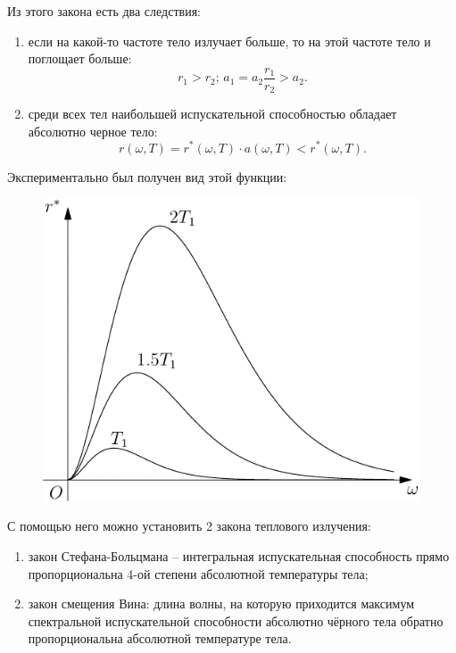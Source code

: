 \documentclass{hedexams}
\begin{document}
Из этого закона есть два следствия:
\begin{enumerate}
    \item если на какой-то частоте тело излучает больше, то на этой частоте тело
        и поглощает больше:
        \[
            r_1 > r_2;\, a_1 = a_2\frac{r_1}{r_2} > a_2.
        \]
    \item среди всех тел наибольшей испускательной способностью обладает
        абсолютно черное тело:
        \[
            r(\omega, T) = r^*(\omega, T)\cdot a(\omega, T) < r^*(\omega, T).
        \]
\end{enumerate}

Экспериментально был получен вид этой функции:
\begin{figure}[h!]
    \center
    \includegraphics[width=.47\textwidth]{image}
\end{figure}

С помощью него можно установить 2 закона теплового излучения:
\begin{enumerate}
    \item закон Стефана-Больцмана -- интегральная испускательная способность
        прямо пропорциональна 4-ой степени абсолютной температуры тела;
    \item закон смещения Вина: длина волны, на которую приходится максимум
        спектральной испускательной способности абсолютно чёрного тела обратно
        пропорциональна абсолютной температуре тела.
\end{enumerate}
\end{document}
